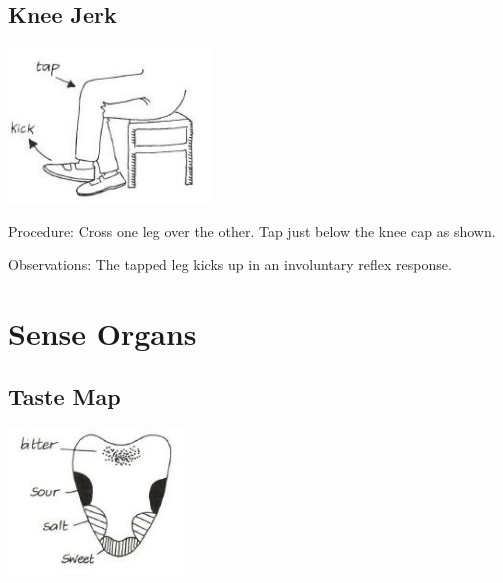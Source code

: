 \begin{multicols}{2}
\subsection{Knee Jerk}

\begin{center}
\includegraphics[width=0.4\textwidth]{./img/vso/knee-jerk.jpg}
\end{center}

\begin{description*}
\item[Procedure:]{Cross one leg over the other. Tap
just below the knee cap as shown.
}
\item[Observations:]{The tapped leg kicks up in an
involuntary reflex response.}
\end{description*}

\columnbreak


\section*{Sense Organs}


\subsection{Taste Map}

\begin{center}
\includegraphics[width=0.35\textwidth]{./img/vso/taste-map.jpg}
\end{center}


\end{multicols}

